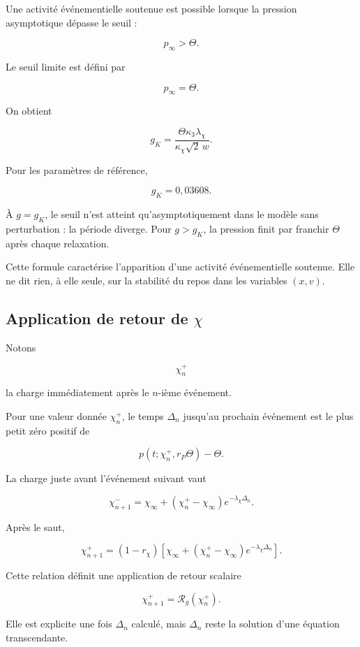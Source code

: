 Une activité événementielle soutenue est possible lorsque la pression
asymptotique dépasse le seuil :

\[
p_\infty>\Theta.
\]

Le seuil limite est défini par

\[
p_\infty=\Theta.
\]

On obtient

\[
\boxed{
g_K
=
\frac{
\Theta\kappa_3\lambda_\chi
}{
\kappa_\chi\sqrt2\,w
}.
}
\]

Pour les paramètres de référence,

\[
\boxed{
g_K=0{,}03608.
}
\]

À \(g=g_K\), le seuil n'est atteint qu'asymptotiquement dans le modèle
sans perturbation : la période diverge. Pour \(g>g_K\), la pression
finit par franchir \(\Theta\) après chaque relaxation.

Cette formule caractérise l'apparition d'une activité événementielle
soutenue. Elle ne dit rien, à elle seule, sur la stabilité du repos
dans les variables \((x,v)\).

\subsection{Application de retour de \texorpdfstring{$\chi$}{chi}}
\label{annexe-r2-retour-chi}

Notons

\[
\chi_n^+
\]

la charge immédiatement après le \(n\)-ième événement.

Pour une valeur donnée \(\chi_n^+\), le temps
\(\Delta_n\) jusqu'au prochain événement est le plus petit zéro positif
de

\[
p(t;\chi_n^+,r_P\Theta)-\Theta.
\]

La charge juste avant l'événement suivant vaut

\[
\chi_{n+1}^-
=
\chi_\infty
+
\left(
\chi_n^+-\chi_\infty
\right)
e^{-\lambda_\chi\Delta_n}.
\]

Après le saut,

\[
\boxed{
\chi_{n+1}^+
=
(1-r_\chi)
\left[
\chi_\infty
+
\left(
\chi_n^+-\chi_\infty
\right)
e^{-\lambda_\chi\Delta_n}
\right].
}
\]

Cette relation définit une application de retour scalaire

\[
\chi_{n+1}^+
=
\mathcal R_g(\chi_n^+).
\]

Elle est explicite une fois \(\Delta_n\) calculé, mais
\(\Delta_n\) reste la solution d'une équation transcendante.

